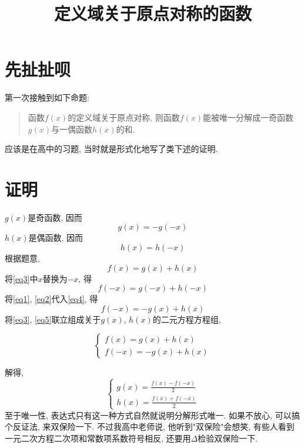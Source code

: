 \documentclass{article}
\begin{document}
\begin{CJK}{UTF8}{gkai}

\title{定义域关于原点对称的函数}
\date{}
\author{}
\maketitle

\section{先扯扯呗}

第一次接触到如下命题: \begin{quote} 
函数$f(x)$的定义域关于原点对称, 则函数$f(x)$能被唯一分解成一奇函数$g(x)$与一偶函数$h(x)$的和.
\end{quote}应该是在高中的习题, 当时就是形式化地写了类下述的证明. 

\section{证明}
$g(x)$是奇函数, 因而
\begin{equation}\label{eq1}g(x) = -g(-x)\end{equation}
$h(x)$是偶函数, 因而
\begin{equation}\label{eq2}h(x) = h(-x)\end{equation}
根据题意,
\begin{equation}\label{eq3}f(x) = g(x) + h(x)\end{equation}
将\eqref{eq3}中$x$替换为$-x$, 得
\begin{equation}\label{eq4}f(-x) = g(-x) + h(-x)\end{equation}
将\eqref{eq1}, \eqref{eq2}代入\eqref{eq4}, 得
\begin{equation}\label{eq5}f(-x) = -g(x) + h(x)\end{equation}
将\eqref{eq3}, \eqref{eq5}联立组成关于$g(x)$, $h(x)$的二元方程方程组, 

\begin{equation}
\begin{cases}
f(x) = g(x) + h(x)\\
f(-x) = -g(x) + h(x)
\end{cases}
\end{equation}

解得,
\begin{equation}
\begin{cases}\label{eq7}
g(x) = \frac{f(x) - f(-x)}{2}\\
h(x) = \frac{f(x) + f(-x)}{2}\end{cases}
\end{equation}
至于唯一性, 表达式只有这一种方式自然就说明分解形式唯一. 如果不放心, 可以搞个反证法, 来双保险一下. 不过我高中老师说, 他听到"双保险"会想笑, 有些人看到一元二次方程二次项和常数项系数符号相反, 还要用$\Delta$检验双保险一下.

\end{CJK}
\end{document}
